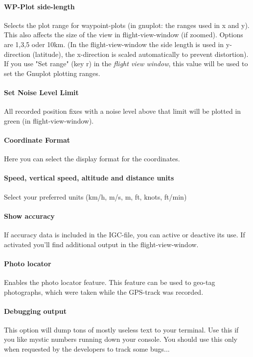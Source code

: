 \paragraph{WP-Plot side-length}
Selects the plot range for waypoint-plots (in gnuplot: the ranges used in x and y).
This also affects the size of the view in flight-view-window (if zoomed).
Options are 1,3,5 oder 10km. (In the flight-view-window the side length
is used in y-direction (latitude), the x-direction is scaled automatically to
prevent distortion).
If you use "Set range" (key r) in the \emph{flight view window}, this value will be used to set the
Gnuplot plotting ranges.

\paragraph{Set Noise Level Limit}
All recorded position fixes with a noise level above that limit will be
plotted in green (in flight-view-window).

\paragraph{Coordinate Format}
Here you can select the display format for the coordinates.

\paragraph{Speed, vertical speed, altitude and distance units}
Select your preferred units (km/h, m/s, m, ft, knots, ft/min)

\paragraph{Show accuracy}
If accuracy data is included in the IGC-file, you can active or deactive its use. 
If activated you'll find additional output in the flight-view-window.

\paragraph{Photo locator}
Enables the photo locator feature. This feature can be used to geo-tag photographs, which were taken while the GPS-track was recorded.

\paragraph{Debugging output}
This option will dump tons of mostly useless text to your terminal. Use this if you like mystic numbers running down
your console. You should use this only when requested by the developers to track some bugs...

